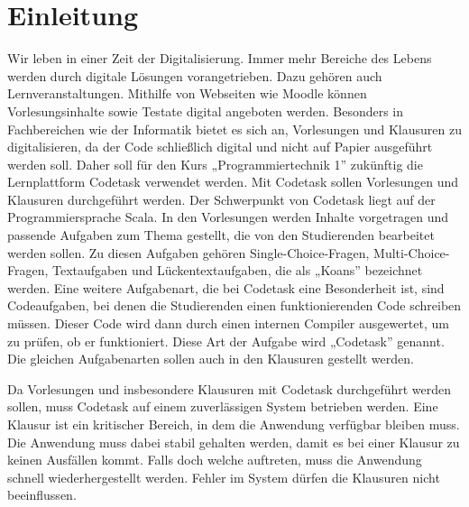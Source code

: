 \chapter{Einleitung}

Wir leben in einer Zeit der Digitalisierung. Immer mehr Bereiche des Lebens werden durch digitale Lösungen vorangetrieben.
Dazu gehören auch Lernveranstaltungen. Mithilfe von Webseiten wie Moodle können Vorlesungsinhalte sowie Testate digital angeboten werden.
Besonders in Fachbereichen wie der Informatik bietet es sich an, Vorlesungen und Klausuren zu digitalisieren, da der Code schließlich digital und nicht auf Papier ausgeführt werden soll.
Daher soll für den Kurs „Programmiertechnik 1” zukünftig die Lernplattform Codetask verwendet werden. 
Mit Codetask sollen Vorlesungen und Klausuren durchgeführt werden. Der Schwerpunkt von Codetask liegt auf der Programmiersprache Scala.
In den Vorlesungen werden Inhalte vorgetragen und passende Aufgaben zum Thema gestellt, die von den Studierenden bearbeitet werden sollen.
Zu diesen Aufgaben gehören Single-Choice-Fragen, Multi-Choice-Fragen, Textaufgaben und Lückentextaufgaben, die als „Koans” bezeichnet werden.
Eine weitere Aufgabenart, die bei Codetask eine Besonderheit ist, sind Codeaufgaben, bei denen die Studierenden einen funktionierenden Code schreiben müssen.
Dieser Code wird dann durch einen internen Compiler ausgewertet, um zu prüfen, ob er funktioniert. Diese Art der Aufgabe wird „Codetask” genannt.
Die gleichen Aufgabenarten sollen auch in den Klausuren gestellt werden.

Da Vorlesungen und insbesondere Klausuren mit Codetask durchgeführt werden sollen, muss Codetask auf einem zuverlässigen System betrieben werden.
Eine Klausur ist ein kritischer Bereich, in dem die Anwendung verfügbar bleiben muss.
Die Anwendung muss dabei stabil gehalten werden, damit es bei einer Klausur zu keinen Ausfällen kommt. Falls doch welche auftreten, muss die Anwendung schnell wiederhergestellt werden.
Fehler im System dürfen die Klausuren nicht beeinflussen.

